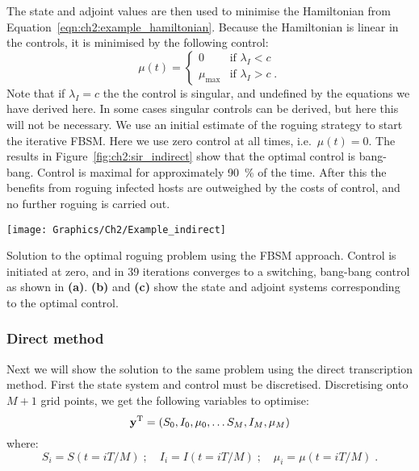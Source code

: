 \begin{example}
    The state and adjoint values are then used to minimise the Hamiltonian from Equation~\ref{eqn:ch2:example_hamiltonian}. Because the Hamiltonian is linear in the controls, it is minimised by the following control:
    \begin{equation}
        \mu(t) = \begin{cases}
            0 & \text{if }\lambda_I < c \\
            \mu_\text{max} & \text{if }\lambda_I > c\;.
        \end{cases}
    \end{equation}
    Note that if $\lambda_I=c$ the the control is singular, and undefined by the equations we have derived here. In some cases singular controls can be derived, but here this will not be necessary. We use an initial estimate of the roguing strategy to start the iterative FBSM\@. Here we use zero control at all times, i.e.\ $\mu(t)=0$. The results in Figure~\ref{fig:ch2:sir_indirect} show that the optimal control is bang-bang. Control is maximal for approximately \SI{90}{\percent} of the time. After this the benefits from roguing infected hosts are outweighed by the costs of control, and no further roguing is carried out.

    {
    \centering
    \captionsetup{type=figure}
        \texttt{[image: Graphics/Ch2/Example\_indirect]}
    \caption[Optimal roguing strategy using the indirect approach]{Solution to the optimal roguing problem using the FBSM approach. Control is initiated at zero, and in 39 iterations converges to a switching, bang-bang control as shown in \textbf{(a)}. \textbf{(b)} and \textbf{(c)} show the state and adjoint systems corresponding to the optimal control.\label{fig:ch2:sir_indirect}}
    }

    \subsubsection{Direct method}
    Next we will show the solution to the same problem using the direct transcription method. First the state system and control must be discretised. Discretising onto $M+1$ grid points, we get the following variables to optimise:
    \begin{equation}
        \mathbf{\bm{y}}^\mathrm{T} = \left(S_0, I_0, \mu_0, \ldots S_M, I_M, \mu_M\right)
    \end{equation}
    where:
    \begin{equation}
            S_i = S(t=iT/M)\;; \quad I_i = I(t=iT/M)\;; \quad \mu_i = \mu(t=iT/M)\;.
    \end{equation}


\end{example}

